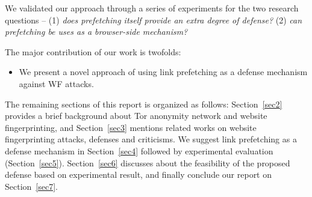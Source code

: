 We validated our approach through a series of experiments for the two research questions -- (1) {\it does prefetching itself provide an extra degree of defense?} (2) {\it can prefetching be uses as a browser-side mechanism?}


The major contribution of our work is twofolds:
\begin{itemize}
\item
We present a novel approach of using link prefetching as a defense mechanism against WF attacks.
\end{itemize}

The remaining sections of this report is organized as follows: Section~\ref{sec2} provides a brief background about Tor anonymity network and website fingerprinting, and Section~\ref{sec3} mentions related works on website fingerprinting attacks, defenses and criticisms.
We suggest link prefetching as a defense mechanism in Section~\ref{sec4} followed by experimental evaluation (Section~\ref{sec5}).
Section~\ref{sec6} discusses about the feasibility of the proposed defense based on experimental result, and finally conclude our report on Section~\ref{sec7}.

